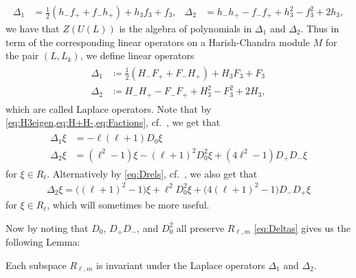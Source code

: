 \begin{align}\label{eq:DeltasaU(L)def}
  \Delta_1 &= \tfrac{1}{2}(h_-f_++f_-h_+)+h_3f_3+f_3, & \Delta_2 &= h_-h_+ - f_-f_+ + h_3^2 - f_3^2 + 2h_3,
\end{align}
we have that $Z(U(L))$ is the algebra of polynomials in $\Delta_1$ and $\Delta_2$. Thus in term of the corresponding linear operators on a Harish-Chandra module $M$ for the pair $(L,L_k)$, we define linear operators
\begin{align}\label{eq:Deltasdef}
  \begin{aligned}
    \Delta_1 &\coloneqq \tfrac{1}{2}(H_-F_++F_-H_+) + H_3F_3 + F_3 \\
    \Delta_2 &\coloneqq H_-H_+ - F_-F_+ + H_3^2 - F_3^2 + 2H_3,
  \end{aligned}
\end{align}
which are called Laplace operators. Note that by \cref{eq:H3eigen,eq:H+H-,eq:Factions}, cf.\ , we get that
\begin{align}\label{eq:Deltas}
  \begin{aligned}
    \Delta_1 \xi &= -\ell(\ell+1)D_0\xi \\
    \Delta_2 \xi &= (\ell^2-1)\xi - (\ell+1)^2D_0^2\xi + (4\ell^2-1)D_+D_-\xi
  \end{aligned}                 
\end{align}
for $\xi\in R_\ell$. Alternatively by \cref{eq:Drels}, cf.\ , we also get that
\begin{align}\label{eq:altDelta2}
  \Delta_2 \xi = \bigl((\ell+1)^2-1\bigr)\xi  + \ell^2D_0^2\xi + \bigl(4(\ell+1)^2-1\bigr)D_-D_+\xi
\end{align}
for $\xi\in R_\ell$, which will sometimes be more useful.

Now by noting that $D_0$, $D_+D_-$, and $D_0^2$ all preserve $R_{\ell,m}$ \cref{eq:Deltas} gives us the following Lemma:
\begin{lemma}\label{lem:R_lmDeltainvariant}
  Each subspace $R_{\ell,m}$ is invariant under the Laplace operators $\Delta_1$ and $\Delta_2$. 
\end{lemma}

